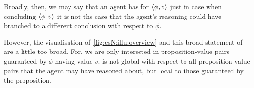 \begin{note}
  Broadly, then, we may say that an agent has \csVed{} for \(\langle \phi, v \rangle\) just in case when concluding \(\langle \phi, v \rangle\) it is not the case that the agent's reasoning could have branched to a different conclusion with respect to \(\phi\).

  However, the visualisation of~\autoref{fig:csN:illu:overview} and this broad statement of \csN{} are a little too broad.
  For, we are only interested in proposition-value pairs guaranteed by \(\phi\) having value \(v\).
  \csN{} is not global with respect to all proposition-value pairs that the agent may have reasoned about, but local to those guaranteed by the proposition.
\end{note}

\paragraph*{}

